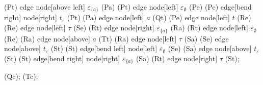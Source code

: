 \begin{isabellebody}
\begin{isamarkuptext}
{{    \path   (Pt)    edge node[above left]           {$\varepsilon_{\{a\}}$}     (Pa)
            (Pt)    edge node[left]                 {$\varepsilon_\emptyset$}   (Pe)
            (Pe)    edge[bend right] node[right]    {$t_\varepsilon$}           (Pt)
            (Pa)    edge node[left]                 {$a$}                       (Qt)
            (Pe)    edge node[left]                 {$t$}                       (Re)
            (Re)    edge node[left]                 {$\tau$}                    (Se)
            (Rt)    edge node[right]                {$\varepsilon_{\{a\}}$}     (Ra)
            (Rt)    edge node[left]                 {$\varepsilon_\emptyset$}   (Re)
            (Ra)    edge node[above]                {$a$}                       (Tt)
            (Ra)    edge node[left]                 {$\tau$}                    (Sa)
            (Se)    edge node[above]                {$t_\varepsilon$}           (St)
            (St)    edge[bend left] node[left]      {$\varepsilon_\emptyset$}   (Se)
            (Sa)    edge node[above]                {$t_\varepsilon$}           (St)
            (St)    edge[bend right] node[right]    {$\varepsilon_{\{a\}}$}   (Sa)
            (Rt)    edge node[right]                {$\tau$}                    (St);
            
    \coordinate [below of=Qt,yshift=10pt] (Qc);
    \coordinate [below of=Tt,yshift=10pt] (Tc);
            
}}
\end{isamarkuptext}
\end{isabellebody}

